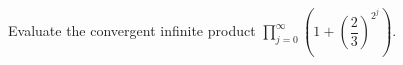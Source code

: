 Evaluate the convergent infinite product $\prod_{j=0}^{\infty}\left(1+(\dfrac{2}{3})^{2^j}\right)$.
